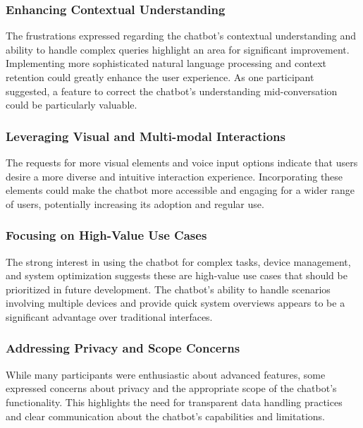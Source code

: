 \subsubsection{Enhancing Contextual Understanding}
The frustrations expressed regarding the chatbot's contextual understanding and ability to handle complex queries highlight an area for significant improvement. Implementing more sophisticated natural language processing and context retention could greatly enhance the user experience. As one participant suggested, a feature to correct the chatbot's understanding mid-conversation could be particularly valuable.
\subsubsection{Leveraging Visual and Multi-modal Interactions}
The requests for more visual elements and voice input options indicate that users desire a more diverse and intuitive interaction experience. Incorporating these elements could make the chatbot more accessible and engaging for a wider range of users, potentially increasing its adoption and regular use.
\subsubsection{Focusing on High-Value Use Cases}
The strong interest in using the chatbot for complex tasks, device management, and system optimization suggests these are high-value use cases that should be prioritized in future development. The chatbot's ability to handle scenarios involving multiple devices and provide quick system overviews appears to be a significant advantage over traditional interfaces.
\subsubsection{Addressing Privacy and Scope Concerns}
While many participants were enthusiastic about advanced features, some expressed concerns about privacy and the appropriate scope of the chatbot's functionality. This highlights the need for transparent data handling practices and clear communication about the chatbot's capabilities and limitations.
